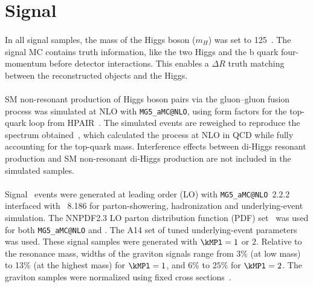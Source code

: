 \section{Signal}
\paragraph{}
In all signal samples, the mass of the Higgs boson ($m_H$) was set to 125~\GeV. 
The signal MC contains truth information, like the two Higgs and the b quark four-momentum before detector interactions. 
This enables a $\Delta R$ truth matching between the reconstructed objects and the Higgs.

\paragraph{}
SM non-resonant production of Higgs boson pairs via the gluon--gluon fusion process was simulated at NLO with \texttt{MG5\_aMC@NLO}, using form factors for the top-quark loop from HPAIR~\cite{PhysRevD.58.115012, Plehn199646}. The simulated events are reweighed to reproduce the \mhh spectrum obtained~\cite{Borowka:2016ehy, Borowka:2016ypz}, which calculated the process at NLO in QCD while fully accounting for the top-quark mass. 
Interference effects between di-Higgs resonant production and SM non-resonant di-Higgs production are not included in the simulated samples. 

\paragraph{}
Signal \Gtohhb\ events were generated at leading order (LO) with \texttt{MG5\_aMC@NLO}~2.2.2~\cite{MGaMCatNLO} interfaced with \pythia~8.186 for parton-showering, hadronization and underlying-event simulation. 
The NNPDF2.3 LO parton distribution function (PDF) set~\cite{Ball:2012cx} was used for both \texttt{MG5\_aMC@NLO} and \pythia. 
The A14 set of tuned underlying-event parameters was used. 
These signal samples were generated with $\kMPl = 1$ or $2$.
Relative to the resonance mass, widths of the graviton signals range from 3\% (at low mass) to 13\% (at the highest mass) for $\kMPl=1$, and $6\%$ to $25\%$ for $\kMPl=2$.
The graviton samples were normalized using fixed cross sections~\cite{carvalho}.

